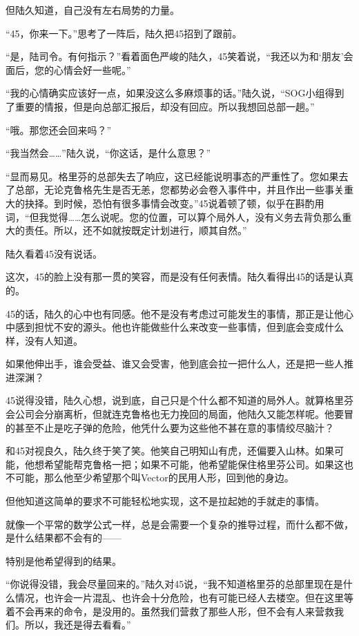 但陆久知道，自己没有左右局势的力量。

“45，你来一下。”思考了一阵后，陆久把45招到了跟前。

“是，陆司令。有何指示？”看着面色严峻的陆久，45笑着说，“我还以为和‘朋友’会面后，您的心情会好一些呢。”

“我的心情确实应该好一点，如果没这么多麻烦事的话。”陆久说，“SOG小组得到了重要的情报，但是向总部汇报后，却没有回应。所以我想回总部一趟。”

“哦。那您还会回来吗？”

“我当然会……”陆久说，“你这话，是什么意思？”

“显而易见。格里芬的总部失去了响应，这已经能说明事态的严重性了。您如果去了总部，无论克鲁格先生是否无恙，您都势必会卷入事件中，并且作出一些事关重大的抉择。到时候，恐怕有很多事情会改变。”45说着顿了顿，似乎在斟酌用词，“但我觉得……怎么说呢。您的位置，可以算个局外人，没有义务去背负那么重大的责任。所以，还不如就按既定计划进行，顺其自然。”

陆久看着45没有说话。

这次，45的脸上没有那一贯的笑容，而是没有任何表情。陆久看得出45的话是认真的。

45的话，陆久的心中也有同感。他不是没有考虑过可能发生的事情，那正是让他心中感到担忧不安的源头。他也许能做些什么来改变一些事情，但到底会变成什么样，没有人知道。

如果他伸出手，谁会受益、谁又会受害，他到底会拉一把什么人，还是把一些人推进深渊？

45说得没错，陆久心想，说到底，自己只是个什么都不知道的局外人。就算格里芬会公司会分崩离析，但就连克鲁格也无力挽回的局面，他陆久又能怎样呢。他要冒的甚至不止是吃子弹的危险，他凭什么要为这些他不甚在意的事情绞尽脑汁？

和45对视良久，陆久终于笑了笑。他笑自己明知山有虎，还偏要入山林。如果可能，他想希望能帮克鲁格一把；如果不可能，他希望能保住格里芬公司。如果这也不可能，那么他至少希望那个叫Vector的民用人形，回到他的身边。

但他知道这简单的要求不可能轻松地实现，这不是拉起她的手就走的事情。

就像一个平常的数学公式一样，总是会需要一个复杂的推导过程，而什么都不做，是什么结果都不会有的——

特别是他希望得到的结果。

“你说得没错，我会尽量回来的。”陆久对45说，“我不知道格里芬的总部里现在是什么情况，也许会一片混乱、也许会十分危险，也有可能已经人去楼空。但在这里等着不会再来的命令，是没用的。虽然我们营救了那些人形，但不会有人来营救我们。所以，我还是得去看看。”

